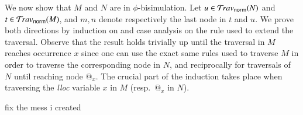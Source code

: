 \documentclass{elsarticle}
\theoremstyle{plain}
\theoremstyle{definition}
\newcommand{\normalizing}{{\sf norm}}
\newcommand{\travsetnorm}{\travset_\normalizing} %
\begin{document}

We now show that $M$ and $N$ are in $\phi$-bisimulation.
Let $u\in \travsetnorm(N)$ and $t\in\travsetnorm(M)$,
and $m, n$ denote respectively the last node in $t$ and $u$.
%
We prove both directions by induction on
and case analysis on the rule used to
extend the traversal.
%
Observe that the result holds trivially up until the traversal in $M$ reaches occurrence $x$ since one can use the exact same rules used to traverse $M$ in order to traverse the corresponding node in $N$, and reciprocally for traversals of $N$ until reaching node $@_x$. The crucial part of the induction takes place when traversing the \emph{lloc} variable $x$ in $M$ (resp.~$@_x$ in $N$).

\begin{todobox}
    fix the mess i created
\end{todobox}
\end{document}
